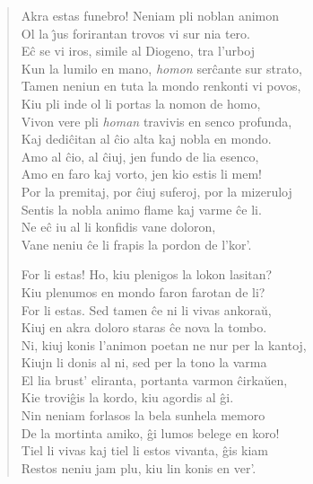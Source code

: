 \begin{verse}
             \vin  Akra estas funebro! Neniam pli noblan animon\\
            Ol la \^{\j}us forirantan trovos vi sur nia tero.\\
            E\^c se vi iros, simile al Diogeno, tra l'urboj\\
            Kun la lumilo en mano, {\sl homon} ser\^cante sur strato,\\
            Tamen neniun en tuta la mondo renkonti vi povos,\\
            Kiu pli inde ol li portas la nomon de homo,\\
            Vivon vere pli {\sl homan} travivis en senco profunda,\\
            Kaj dedi\^citan al \^cio alta kaj nobla en mondo.\\
            Amo al \^cio, al \^ciuj, jen fundo de lia esenco,\\
            Amo en faro kaj vorto, jen kio estis li mem!\\
            Por la premitaj, por \^ciuj suferoj, por la mizeruloj\\
            Sentis la nobla animo flame kaj varme \^ce li.\\
            Ne e\^c iu al li konfidis vane doloron,\\
            Vane neniu \^ce li frapis la pordon de l'kor'.

            \vin   For li estas! Ho, kiu plenigos la lokon lasitan?\\
            Kiu plenumos en mondo faron farotan de li?\\
            For li estas. Sed tamen \^ce ni li vivas ankora\u u,\\
            Kiuj en akra doloro staras \^ce nova la tombo.\\
            Ni, kiuj konis l'animon poetan ne nur per la kantoj,\\
            Kiujn li donis al ni, sed per la tono la varma\\
            El lia brust' eliranta, portanta varmon \^cirka\u uen,\\
            Kie trovi\^gis la kordo, kiu agordis al \^gi.\\
            Nin neniam forlasos la bela sunhela memoro\\
            De la mortinta amiko, \^gi lumos belege en koro!\\
            Tiel li vivas kaj tiel li estos vivanta, \^gis kiam\\
            Restos neniu jam plu, kiu lin konis en ver'.

\end{verse}

\smallrule{}
